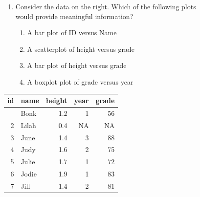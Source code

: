 \documentclass[
  letterpaper,
  DIV=11,
  numbers=noendperiod]{scrartcl}
\newcounter{none} %
\providecommand{\tightlist}{%
  \setlength{\itemsep}{0pt}\setlength{\parskip}{0pt}}
\begin{document}
\begin{figure}

\begin{minipage}[t]{0.50\linewidth}

\begin{enumerate}
\def\labelenumi{\arabic{enumi}.}
\setcounter{enumi}{2}
\tightlist
\item
  Consider the data on the right. Which of the following plots would
  provide meaningful information?

  \begin{enumerate}
  \def\labelenumii{\alph{enumii}.}
  \tightlist
  \item
    A bar plot of ID versus Name
  \item
    A scatterplot of height versus grade
  \item
    A bar plot of height versus grade
  \item
    A boxplot plot of grade versus year
  \end{enumerate}
\end{enumerate}

\end{minipage}%
%
\begin{minipage}[t]{0.50\linewidth}

{\def\LTcaptype{none} %
\begin{longtable}[]{@{}rlrrr@{}}
\toprule\noalign{}
id & name & height & year & grade \\
\midrule\noalign{}
\endhead
\bottomrule\noalign{}
\endlastfoot
1 & Bonk & 1.2 & 1 & 56 \\
2 & Lilah & 0.4 & NA & NA \\
3 & June & 1.4 & 3 & 88 \\
4 & Judy & 1.6 & 2 & 75 \\
5 & Julie & 1.7 & 1 & 72 \\
6 & Jodie & 1.9 & 1 & 83 \\
7 & Jill & 1.4 & 2 & 81 \\
\end{longtable}
}

\end{minipage}%

\end{figure}%
\end{document}
